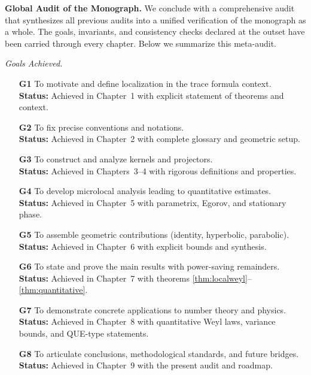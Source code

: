 \bigskip
\noindent\textbf{Global Audit of the Monograph.}
We conclude with a comprehensive audit that synthesizes all previous audits into a unified verification of the monograph as a whole. The goals, invariants, and consistency checks declared at the outset have been carried through every chapter. Below we summarize this meta-audit.

\medskip
\noindent\textit{Goals Achieved.}
\begin{itemize}
  \item[\textbf{G1}] To motivate and define localization in the trace formula context. \\
  \textbf{Status:} Achieved in Chapter~1 with explicit statement of theorems and context.
  \item[\textbf{G2}] To fix precise conventions and notations. \\
  \textbf{Status:} Achieved in Chapter~2 with complete glossary and geometric setup.
  \item[\textbf{G3}] To construct and analyze kernels and projectors. \\
  \textbf{Status:} Achieved in Chapters~3–4 with rigorous definitions and properties.
  \item[\textbf{G4}] To develop microlocal analysis leading to quantitative estimates. \\
  \textbf{Status:} Achieved in Chapter~5 with parametrix, Egorov, and stationary phase.
  \item[\textbf{G5}] To assemble geometric contributions (identity, hyperbolic, parabolic). \\
  \textbf{Status:} Achieved in Chapter~6 with explicit bounds and synthesis.
  \item[\textbf{G6}] To state and prove the main results with power-saving remainders. \\
  \textbf{Status:} Achieved in Chapter~7 with theorems \ref{thm:localweyl}–\ref{thm:quantitative}.
  \item[\textbf{G7}] To demonstrate concrete applications to number theory and physics. \\
  \textbf{Status:} Achieved in Chapter~8 with quantitative Weyl laws, variance bounds, and QUE-type statements.
  \item[\textbf{G8}] To articulate conclusions, methodological standards, and future bridges. \\
  \textbf{Status:} Achieved in Chapter~9 with the present audit and roadmap.
\end{itemize}


